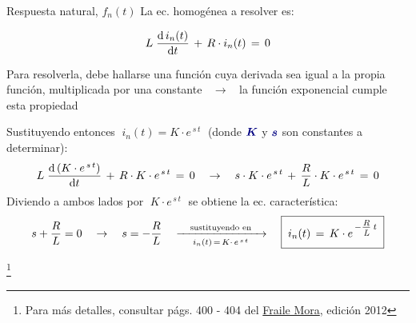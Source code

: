 \documentclass[aspectratio=169, usenames,svgnames,dvipsnames]{beamer}
\renewcommand{\thefootnote}{\fnsymbol{footnote}}
\newcommand\blfootnote[1]{%
    \begingroup
    \renewcommand\thefootnote{}\footnote{#1}%
    \addtocounter{footnote}{-1}%
    \endgroup
} %
\begin{document}

\begin{frame}{Respuesta natural, \hspace{3mm}$f_n(t)$} \label{diapo:deduccion_PrimerOrden}
    \vspace{3mm}
    La ec. homogénea a resolver es:  

    \vspace{-5mm}
    \[
      L \; \diff{\,i_n(t)}{t} \,+\, R \cdot i_n(t) \, = \,  0
    \]
    
    Para resolverla, debe hallarse una función cuya \alert{derivada sea igual a la propia función}, multiplicada por una constante $\;\;\rightarrow\;\;$ la \alert{función exponencial} cumple esta propiedad 

    \vspace{4mm}
    \alert{Sustituyendo} entonces $\; i_n(t) = K \cdot e^{\,s\,t} \;$ (donde ${\boldsymbol{\color{blue!50!black} K}}$ y ${\boldsymbol{\color{blue!50!black} s}}$ son \alert{constantes} a determinar):
    \[
      L \; \diff{\,(K \cdot e^{\,s\,t})}{t} \,+\, R \cdot K \cdot e^{\,s\,t} \, = \,  0 
      \quad\rightarrow\quad 
      s \cdot K \cdot e^{\,s\,t} \,+\, \frac{R}{L} \cdot K \cdot e^{\,s\,t}   \, = \,  0
    \]
    Diviendo a ambos lados por $\; K \cdot e^{\,s\,t} \;$ se obtiene la  \alert{ec. característica}:
    \[
      s + \frac{R}{L} = 0 
      \quad\rightarrow\quad
      s = -\frac{R}{L}       
      \quad \xrightarrow[i_n(t) \,=\, K \cdot \, e^{\,s\,t}]{\quad \textrm{sustituyendo en} \quad} \quad
      \boxed{\; \vphantom{\dfrac{a}{a}} i_n(t) \,=\, K \cdot e^{\,-\frac{\vphantom{j} \scalebox{1.5} {\tiny \textit{R}}}{\vphantom{\scalebox{2} {\tiny \textit{L}}} \scalebox{1.5} {\tiny \textit{L}}} \,\scalebox{1.5} {\tiny \textit{t}}} \;}
    \]

    \blfootnote{Para más detalles, consultar págs. 400 - 404 del \href{https://ingenio.upm.es/primo-explore/fulldisplay?docid=34UPM_ALMA2150534070004212\&context=L\&vid=34UPM_VU1\&lang=es_ES\&search_scope=TAB1_SCOPE1\&adaptor=Local\%20Search\%20Engine\&isFrbr=true\&tab=tab1\&query=any,contains,circuitos\%20electricos\%20fraile\%20mora\&sortby=date\&facet=frbrgroupid,include,578542795\&offset=0}{Fraile Mora}, edición 2012}
\end{frame}

\end{document}
